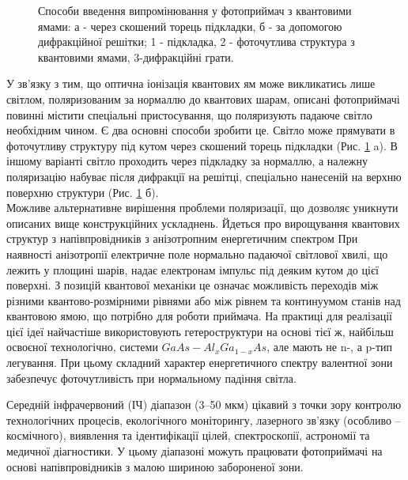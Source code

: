 \documentclass[a4paper,14pt]{extreport}
\begin{document}
\begin{figure}[h!]
   \caption{Способи введення випромінювання у фотоприймач з
квантовими ямами: а - через скошений торець підкладки,
б - за допомогою дифракційної решітки;
1 - підкладка, 2 - фоточутлива структура з
квантовими ямами, 3-дифракційні грати.}
   \label{r4}
 \end{figure}

У зв'язку з тим, що оптична іонізація квантових ям може
викликатись лише світлом, поляризованим за нормаллю до квантових
шарам, описані фотоприймачі повинні містити спеціальні
пристосування, що поляризують падаюче світло необхідним чином.
Є два основні способи зробити це. Світло може прямувати в
фоточутливу структуру під кутом через скошений торець
підкладки (Рис. \ref{r4} a). В іншому варіанті світло проходить через
підкладку за нормаллю, а належну поляризацію набуває після
дифракції на решітці, спеціально нанесеній на верхню
поверхню структури (Рис. \ref{r4} б).\\

Можливе альтернативне вирішення проблеми поляризації,
що дозволяє уникнути описаних вище конструкційних
ускладнень. Йдеться про вирощування квантових структур з
напівпровідників з анізотропним енергетичним спектром При
наявності анізотропії електричне поле нормально падаючої
світлової хвилі, що лежить у площині шарів, надає електронам
імпульс під деяким кутом до цієї поверхні. З позицій квантової
механіки це означає можливість переходів між різними
квантово-розмірними рівнями або між рівнем та континуумом
станів над квантовою ямою, що потрібно для роботи приймача.
На практиці для реалізації цієї ідеї найчастіше використовують
гетероструктури на основі тієї ж, найбільш освоєної
технологічно, системи $GaAs-Al_xGa_{1-x}As$, але мають не n-, а p-тип
легування. При цьому складний характер енергетичного спектру
валентної зони забезпечує фоточутливість при нормальному
падіння світла.



Середній інфрачервоний (ІЧ) діапазон (3–50 мкм) цікавий з точки
зору контролю технологічних процесів, екологічного моніторингу,
лазерного зв’язку (особливо – космічного), виявлення та ідентифікації
цілей, спектроскопії, астрономії та медичної діагностики. У цьому
діапазоні можуть працювати фотоприймачі на основі напівпровідників
з малою шириною забороненої зони.\\ 
 
\end{document}
